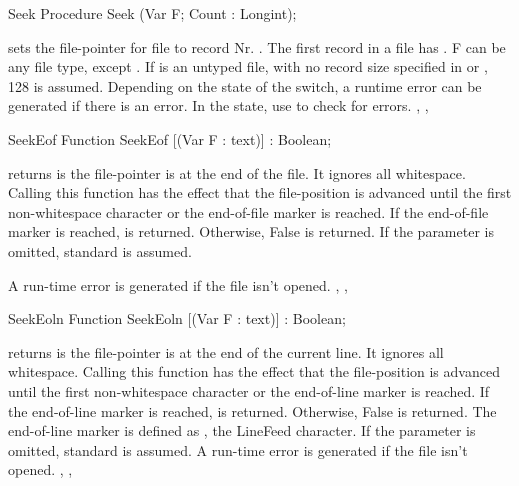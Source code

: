 
\begin{procedure}{Seek}
\Declaration
Procedure Seek (Var F; Count : Longint);

\Description
{} sets the file-pointer for file  to record Nr. .
The first record in a file has . F can be any file type, except
. If  is an untyped file, with no record size specified in
 or , 128 is assumed.
\Errors
Depending on the state of the  switch, a runtime error can be 
generated if there is an error. In the  state, use 
to check for errors.
\SeeAlso
{}, , 
\end{procedure}


\begin{function}{SeekEof}
\Declaration
Function SeekEof [(Var F : text)] : Boolean;

\Description
{} returns  is the file-pointer is at the end of the
file. It ignores all whitespace.
Calling this function has the effect that the file-position is advanced
until the first non-whitespace character or the end-of-file marker is
reached.
If the end-of-file marker is reached,  is returned. Otherwise,
False is returned.
If the parameter  is omitted, standard  is assumed.

\Errors
A run-time error is generated if the file  isn't opened.
\SeeAlso
{}, , 
\end{function}


\begin{function}{SeekEoln}
\Declaration
Function SeekEoln [(Var F : text)] : Boolean;

\Description
{} returns  is the file-pointer is at the end of the
current line. It ignores all whitespace.
Calling this function has the effect that the file-position is advanced
until the first non-whitespace character or the end-of-line marker is
reached.
If the end-of-line marker is reached,  is returned. Otherwise,
False is returned.
The end-of-line marker is defined as , the LineFeed character.
If the parameter  is omitted, standard  is assumed.
\Errors
A run-time error is generated if the file  isn't opened.
\SeeAlso
{}, , 
\end{function}

